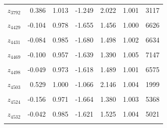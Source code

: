 \begin{longtable}{lrrrrrr}
$z_{3792}$ & 0.386 & 1.013 & -1.249 & 2.022 & 1.001 & 3117\\
\cellcolor{gray!10}{$z_{4281}$} & \cellcolor{gray!10}{-0.087} & \cellcolor{gray!10}{0.960} & \cellcolor{gray!10}{-1.657} & \cellcolor{gray!10}{1.453} & \cellcolor{gray!10}{1.002} & \cellcolor{gray!10}{5144}\\
$z_{4429}$ & -0.104 & 0.978 & -1.655 & 1.456 & 1.000 & 6626\\
\cellcolor{gray!10}{$z_{4430}$} & \cellcolor{gray!10}{-0.074} & \cellcolor{gray!10}{0.970} & \cellcolor{gray!10}{-1.613} & \cellcolor{gray!10}{1.464} & \cellcolor{gray!10}{1.003} & \cellcolor{gray!10}{5952}\\
$z_{4431}$ & -0.084 & 0.985 & -1.680 & 1.498 & 1.002 & 6634\\
\cellcolor{gray!10}{$z_{4448}$} & \cellcolor{gray!10}{-0.086} & \cellcolor{gray!10}{0.938} & \cellcolor{gray!10}{-1.598} & \cellcolor{gray!10}{1.417} & \cellcolor{gray!10}{1.002} & \cellcolor{gray!10}{5420}\\
$z_{4469}$ & -0.100 & 0.957 & -1.639 & 1.390 & 1.005 & 7147\\
\cellcolor{gray!10}{$z_{4478}$} & \cellcolor{gray!10}{-0.115} & \cellcolor{gray!10}{0.956} & \cellcolor{gray!10}{-1.630} & \cellcolor{gray!10}{1.427} & \cellcolor{gray!10}{1.002} & \cellcolor{gray!10}{5962}\\
$z_{4498}$ & -0.049 & 0.973 & -1.618 & 1.489 & 1.001 & 6575\\
\cellcolor{gray!10}{$z_{4500}$} & \cellcolor{gray!10}{-0.087} & \cellcolor{gray!10}{0.983} & \cellcolor{gray!10}{-1.638} & \cellcolor{gray!10}{1.476} & \cellcolor{gray!10}{1.001} & \cellcolor{gray!10}{6547}\\
$z_{4503}$ & 0.529 & 1.000 & -1.066 & 2.146 & 1.004 & 1999\\
\cellcolor{gray!10}{$z_{4522}$} & \cellcolor{gray!10}{-0.032} & \cellcolor{gray!10}{0.991} & \cellcolor{gray!10}{-1.609} & \cellcolor{gray!10}{1.538} & \cellcolor{gray!10}{1.002} & \cellcolor{gray!10}{7432}\\
$z_{4524}$ & -0.156 & 0.971 & -1.664 & 1.380 & 1.003 & 5368\\
\cellcolor{gray!10}{$z_{4527}$} & \cellcolor{gray!10}{-0.025} & \cellcolor{gray!10}{0.974} & \cellcolor{gray!10}{-1.570} & \cellcolor{gray!10}{1.542} & \cellcolor{gray!10}{1.001} & \cellcolor{gray!10}{6299}\\
$z_{4532}$ & -0.042 & 0.985 & -1.621 & 1.525 & 1.004 & 5021\\
\cellcolor{gray!10}{$z_{4572}$} & \cellcolor{gray!10}{-0.054} & \cellcolor{gray!10}{0.998} & \cellcolor{gray!10}{-1.666} & \cellcolor{gray!10}{1.541} & \cellcolor{gray!10}{1.002} & \cellcolor{gray!10}{6892}\\

\end{longtable}

